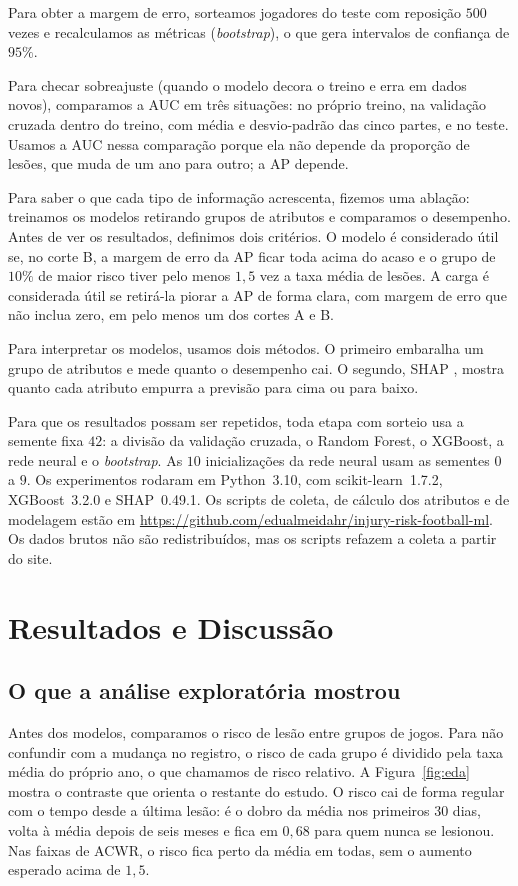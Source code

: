 \documentclass[conference]{IEEEtran}
\begin{document}
Para obter a margem de erro, sorteamos jogadores do teste com reposição $500$ vezes e recalculamos as métricas (\textit{bootstrap}), o que gera intervalos de confiança de $95\%$.

Para checar sobreajuste (quando o modelo decora o treino e erra em dados novos), comparamos a AUC em três situações: no próprio treino, na validação cruzada dentro do treino, com média e desvio-padrão das cinco partes, e no teste. Usamos a AUC nessa comparação porque ela não depende da proporção de lesões, que muda de um ano para outro; a AP depende.

Para saber o que cada tipo de informação acrescenta, fizemos uma ablação: treinamos os modelos retirando grupos de atributos e comparamos o desempenho. Antes de ver os resultados, definimos dois critérios. O modelo é considerado útil se, no corte B, a margem de erro da AP ficar toda acima do acaso e o grupo de $10\%$ de maior risco tiver pelo menos $1{,}5$ vez a taxa média de lesões. A carga é considerada útil se retirá-la piorar a AP de forma clara, com margem de erro que não inclua zero, em pelo menos um dos cortes A e B.

Para interpretar os modelos, usamos dois métodos. O primeiro embaralha um grupo de atributos e mede quanto o desempenho cai. O segundo, SHAP \cite{lundberg2017}, mostra quanto cada atributo empurra a previsão para cima ou para baixo.

Para que os resultados possam ser repetidos, toda etapa com sorteio usa a semente fixa $42$: a divisão da validação cruzada, o Random Forest, o XGBoost, a rede neural e o \textit{bootstrap}. As $10$ inicializações da rede neural usam as sementes $0$ a $9$. Os experimentos rodaram em Python~3.10, com scikit-learn~1.7.2, XGBoost~3.2.0 e SHAP~0.49.1. Os scripts de coleta, de cálculo dos atributos e de modelagem estão em \url{https://github.com/edualmeidahr/injury-risk-football-ml}. Os dados brutos não são redistribuídos, mas os scripts refazem a coleta a partir do site.

\section{Resultados e Discussão}

\subsection{O que a análise exploratória mostrou}

Antes dos modelos, comparamos o risco de lesão entre grupos de jogos. Para não confundir com a mudança no registro, o risco de cada grupo é dividido pela taxa média do próprio ano, o que chamamos de risco relativo. A Figura~\ref{fig:eda} mostra o contraste que orienta o restante do estudo. O risco cai de forma regular com o tempo desde a última lesão: é o dobro da média nos primeiros $30$ dias, volta à média depois de seis meses e fica em $0{,}68$ para quem nunca se lesionou. Nas faixas de ACWR, o risco fica perto da média em todas, sem o aumento esperado acima de $1{,}5$.
\end{document}
